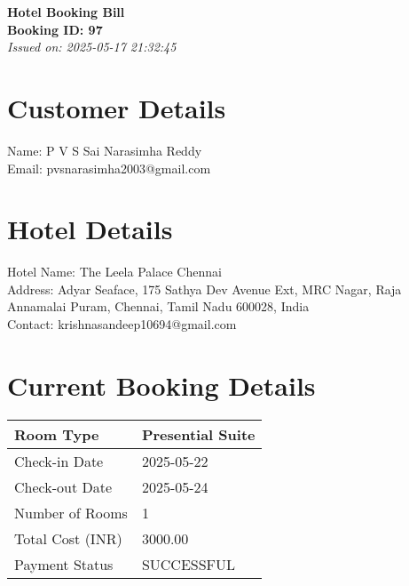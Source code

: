 \documentclass[a4paper,12pt]{article}
\begin{document}
\begin{center}
\textbf{\Large Hotel Booking Bill}\\ 
\vspace{0.5cm}
\textbf{Booking ID: 97}\\ 
\vspace{0.5cm}
\textit{Issued on: 2025-05-17 21:32:45}
\end{center}
\vspace{1cm}
\section*{Customer Details}
Name: P V S Sai Narasimha Reddy\\ 
Email: pvsnarasimha2003@gmail.com\\ 
\vspace{0.5cm}
\section*{Hotel Details}
Hotel Name: The Leela Palace Chennai\\ 
Address: Adyar Seaface, 175 Sathya Dev Avenue Ext, MRC Nagar, Raja Annamalai Puram, Chennai, Tamil Nadu 600028, India\\ 
Contact: krishnasandeep10694@gmail.com\\ 
\vspace{0.5cm}
\section*{Current Booking Details}
\begin{tabular}{|l|l|}
\hline
Room Type & Presential Suite\\ 
\hline
Check-in Date & 2025-05-22\\ 
\hline
Check-out Date & 2025-05-24\\ 
\hline
Number of Rooms & 1\\ 
\hline
Total Cost (INR) & 3000.00\\ 
\hline
Payment Status & SUCCESSFUL\\ 
\hline
\end{tabular}
\vspace{0.5cm}
\end{document}
